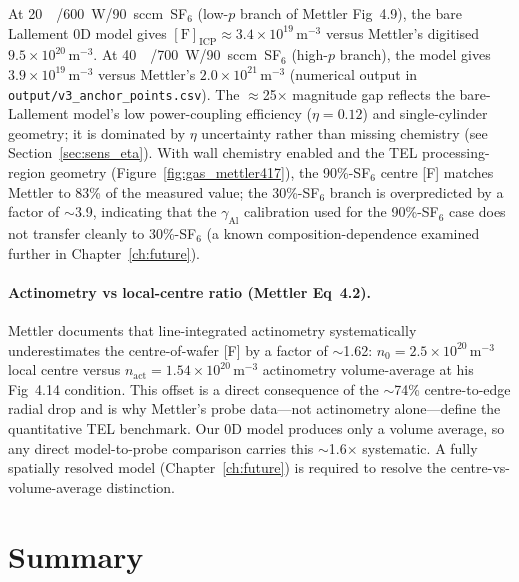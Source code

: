 \documentclass[11pt,a4paper]{report}
\begin{document}
At \SI{20}{\milli\torr}/\SI{600}{\watt}/\SI{90}{sccm}~SF$_6$ (low-$p$ branch of Mettler Fig~4.9), the bare Lallement 0D model gives $[\mathrm{F}]_{\mathrm{ICP}} \approx 3.4\times10^{19}$\,m$^{-3}$ versus Mettler's digitised $9.5\times10^{20}$\,m$^{-3}$.  At \SI{40}{\milli\torr}/\SI{700}{\watt}/\SI{90}{sccm}~SF$_6$ (high-$p$ branch), the model gives $3.9\times10^{19}$\,m$^{-3}$ versus Mettler's $2.0\times10^{21}$\,m$^{-3}$ (numerical output in \texttt{output/v3\_anchor\_points.csv}).  The $\approx$25$\times$ magnitude gap reflects the bare-Lallement model's low power-coupling efficiency ($\eta=0.12$) and single-cylinder geometry; it is dominated by $\eta$ uncertainty rather than missing chemistry (see Section~\ref{sec:sens_eta}).  With wall chemistry enabled and the TEL processing-region geometry (Figure~\ref{fig:gas_mettler417}), the 90\%-SF$_6$ centre [F] matches Mettler to 83\% of the measured value; the 30\%-SF$_6$ branch is overpredicted by a factor of $\sim$3.9, indicating that the $\gamma_{\mathrm{Al}}$ calibration used for the 90\%-SF$_6$ case does not transfer cleanly to 30\%-SF$_6$ (a known composition-dependence examined further in Chapter~\ref{ch:future}).

\paragraph{Actinometry vs local-centre ratio (Mettler Eq~4.2).}  Mettler documents that line-integrated actinometry systematically underestimates the centre-of-wafer [F] by a factor of $\sim$1.62: $n_{0} = 2.5\times10^{20}$\,m$^{-3}$ local centre versus $n_{\mathrm{act}} = 1.54\times10^{20}$\,m$^{-3}$ actinometry volume-average at his Fig~4.14 condition.  This offset is a direct consequence of the $\sim$74\% centre-to-edge radial drop and is why Mettler's probe data---not actinometry alone---define the quantitative TEL benchmark.  Our 0D model produces only a volume average, so any direct model-to-probe comparison carries this $\sim$1.6$\times$ systematic.  A fully spatially resolved model (Chapter~\ref{ch:future}) is required to resolve the centre-vs-volume-average distinction.

\section{Summary}
\label{sec:gasphase_summary}
\end{document}
